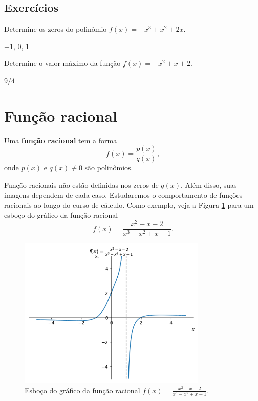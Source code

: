 \subsection*{Exercícios}

\begin{exer}
  Determine os zeros do polinômio $f(x) = -x^3+x^2+2x$.
\end{exer}
\begin{resp}
  $-1$, $0$, $1$
\end{resp}

\begin{exer}
  Determine o valor máximo da função $f(x) = -x^2 + x + 2$.
\end{exer}
\begin{resp}
  $9/4$
\end{resp}

\section{Função racional}\label{cap_funcao_sec_funracio}

Uma {\bf função racional} tem a forma
\begin{equation}
  f(x) = \frac{p(x)}{q(x)},
\end{equation}
onde $p(x)$ e $q(x)\not\equiv 0$ são polinômios.

Função racionais não estão definidas nos zeros de $q(x)$. Além disso, suas imagens dependem de cada caso. Estudaremos o comportamento de funções racionais ao longo do curso de cálculo. Como exemplo, veja a Figura \ref{fig:racional_grafico} para um esboço do gráfico da função racional
\begin{equation}
  f(x) = \frac{x^2-x-2}{x^3-x^2+x-1}.
\end{equation}

\begin{figure}[H]
  \centering
  \includegraphics[width=0.8\textwidth]{./cap_funcao/dados/fig_racional_grafico/fig_racional_grafico}
  \caption{Esboço do gráfico da função racional $f(x) = \frac{x^{2} - x - 2}{x^{3} - x^{2} + x - 1}$.}
  \label{fig:racional_grafico}
\end{figure}

